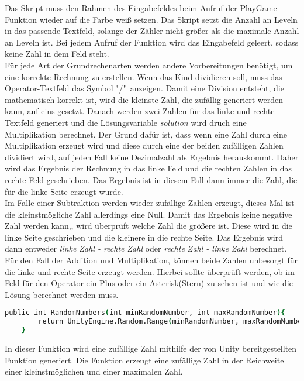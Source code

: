 Das Skript muss den Rahmen des Eingabefeldes beim Aufruf der PlayGame-Funktion wieder auf die Farbe weiß setzen. Das Skript setzt die Anzahl an Leveln in das passende Textfeld, solange der Zähler nicht größer als die maximale Anzahl an Leveln ist. Bei jedem Aufruf der Funktion wird das Eingabefeld geleert, sodass keine Zahl in dem Feld steht.\\
Für jede Art der Grundrechenarten werden andere Vorbereitungen benötigt, um eine korrekte Rechnung zu erstellen. Wenn das Kind dividieren soll, muss das Operator-Textfeld das Symbol "/"\ anzeigen. Damit eine Division entsteht, die mathematisch korrekt ist, wird die kleinste Zahl, die zufällig generiert werden kann, auf eins gesetzt. Danach werden zwei Zahlen für das linke und rechte Textfeld generiert und die Lösungsvariable \textit{solution} wird druch eine Multiplikation berechnet. Der Grund dafür ist, dass wenn eine Zahl durch eine Multiplikation erzeugt wird und diese durch eine der beiden zufälligen Zahlen dividiert wird, auf jeden Fall keine Dezimalzahl als Ergebnis herauskommt. Daher wird das Ergebnis der Rechnung in das linke Feld und die rechten Zahlen in das rechte Feld geschrieben. Das Ergebnis ist in diesem Fall dann immer die Zahl, die für die linke Seite erzeugt wurde.\\
Im Falle einer Subtraktion werden wieder zufällige Zahlen erzeugt, dieses Mal ist die kleinstmögliche Zahl allerdings eine Null. Damit das Ergebnis keine negative Zahl werden kann,, wird überprüft welche Zahl die größere ist. Diese wird in die linke Seite geschrieben und die kleinere in die rechte Seite. Das Ergebnis wird dann entweder \textit{linke Zahl - rechte Zahl} oder \textit{rechte Zahl - linke Zahl} berechnet.\\
Für den Fall der Addition und Multiplikation, können beide Zahlen unbesorgt für die linke und rechte Seite erzeugt werden. Hierbei sollte überprüft werden, ob im Feld für den Operator ein Plus oder ein Asterisk(Stern) zu sehen ist und wie die Lösung berechnet werden muss.\\
\begin{lstlisting}[language=csh, caption={MathOperations.cs RandomNumber-Funktion}]
	public int RandomNumbers(int minRandomNumber, int maxRandomNumber){
		return UnityEngine.Random.Range(minRandomNumber, maxRandomNumber);
	}
\end{lstlisting}
In dieser Funktion wird eine zufällige Zahl mithilfe der von Unity bereitgestellten Funktion generiert. Die Funktion erzeugt eine zufällige Zahl in der Reichweite einer kleinstmöglichen und einer maximalen Zahl.\\
